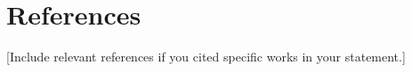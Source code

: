 \documentclass[11pt,a4paper]{article}
\begin{document}
\section{References}
[Include relevant references if you cited specific works in your statement.]

\end{document}
